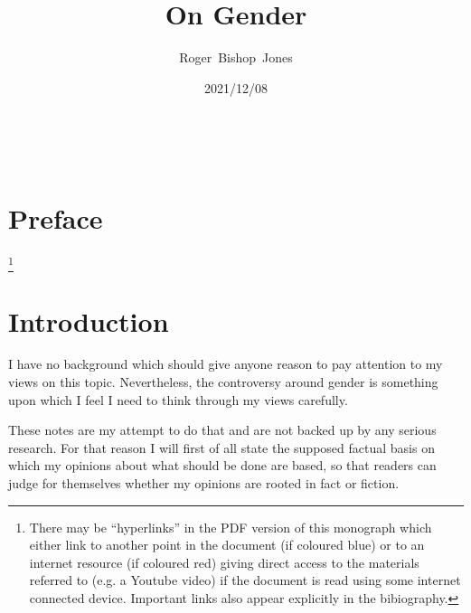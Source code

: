 \documentclass[10pt,titlepage]{article}
\title{\LARGE\bf On Gender}
\author{Roger~Bishop~Jones}
\date{\small 2021/12/08}
\newcommand{\ignore}[1]{}
\begin{document}
                               
\begin{titlepage}
\maketitle





\end{titlepage}

\ \

\ignore{
\begin{centering}
{}
\end{centering}
}%

\setcounter{tocdepth}{2}
{\parskip-0pt\tableofcontents}


\pagebreak

\section*{Preface}


\footnote{There may be ``hyperlinks'' in the PDF version of this monograph which either link to another point in the document  (if coloured blue) or to an internet resource  (if coloured red) giving direct access to the materials referred to (e.g. a Youtube video) if the document is read using some internet connected device.
Important links also appear explicitly in the bibiography.}

\section{Introduction}

I have no background which should give anyone reason to pay attention to my views on this topic.
Nevertheless, the controversy around gender is something upon which I feel I need to think through my views carefully.

These notes are my attempt to do that and are not backed up by any serious research.
For that reason I will first of all state the supposed factual basis on which my opinions about what should be done are based, so that readers can judge for themselves whether my opinions are rooted in fact or fiction.
\end{document}
